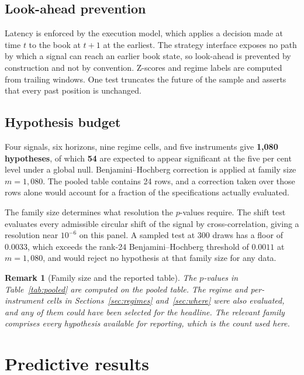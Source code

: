 \documentclass[11pt]{scrartcl}
\newtheorem{remark}{Remark}[section]
\begin{document}
\subsection{Look-ahead prevention}
\label{sec:lookahead}

Latency is enforced by the execution model, which applies a decision made at time $t$ to the book at $t+1$ at the earliest. The strategy interface exposes no path by which a signal can reach an earlier book state, so look-ahead is prevented by construction and not by convention. Z-scores and regime labels are computed from trailing windows. One test truncates the future of the sample and asserts that every past position is unchanged.

\subsection{Hypothesis budget}
\label{sec:budget}

Four signals, six horizons, nine regime cells, and five instruments give \textbf{1{,}080 hypotheses}, of which \textbf{54} are expected to appear significant at the five per cent level under a global null. Benjamini--Hochberg correction \cite{Benjamini1995} is applied at family size $m = 1{,}080$. The pooled table contains 24 rows, and a correction taken over those rows alone would account for a fraction of the specifications actually evaluated.

The family size determines what resolution the $p$-values require. The shift test evaluates every admissible circular shift of the signal by cross-correlation, giving a resolution near $10^{-6}$ on this panel. A sampled test at 300 draws has a floor of $0.0033$, which exceeds the rank-24 Benjamini--Hochberg threshold of $0.0011$ at $m = 1{,}080$, and would reject no hypothesis at that family size for any data.

\begin{remark}[Family size and the reported table]
\label{rem:family}
The $p$-values in Table~\ref{tab:pooled} are computed on the pooled table. The regime and per-instrument cells in Sections~\ref{sec:regimes} and~\ref{sec:where} were also evaluated, and any of them could have been selected for the headline. The relevant family comprises every hypothesis available for reporting, which is the count used here.
\end{remark}
\section{Predictive results}
\label{sec:predictive}
\end{document}
